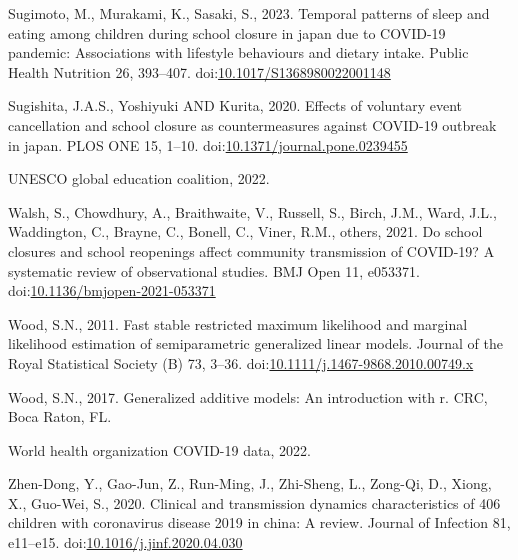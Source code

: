 \documentclass[unnumsec,webpdf,contemporary,large]{oup-authoring-template}%
\theoremstyle{thmstyleone}%
\theoremstyle{thmstyletwo}%
\theoremstyle{thmstylethree}%
\newlength{\cslhangindent}
\newlength{\cslentryspacingunit} %
\newenvironment{CSLReferences}[2] %
 {%
  \setlength{\parindent}{0pt}
  \ifodd #1
  \let\oldpar\par
  \def\par{\hangindent=\cslhangindent\oldpar}
  \fi
  \setlength{\parskip}{#2\cslentryspacingunit}
 }%
 {}
\begin{document}
\begin{CSLReferences}{1}{0}
\leavevmode{}%
Sugimoto, M., Murakami, K., Sasaki, S., 2023. Temporal patterns of sleep and eating among children during school closure in japan due to COVID-19 pandemic: Associations with lifestyle behaviours and dietary intake. Public Health Nutrition 26, 393--407. doi:\href{https://doi.org/10.1017/S1368980022001148}{10.1017/S1368980022001148}

\leavevmode{}%
Sugishita, J.A.S., Yoshiyuki AND Kurita, 2020. Effects of voluntary event cancellation and school closure as countermeasures against COVID-19 outbreak in japan. PLOS ONE 15, 1--10. doi:\href{https://doi.org/10.1371/journal.pone.0239455}{10.1371/journal.pone.0239455}

\leavevmode{}%
{UNESCO} global education coalition, 2022.

\leavevmode{}%
Walsh, S., Chowdhury, A., Braithwaite, V., Russell, S., Birch, J.M., Ward, J.L., Waddington, C., Brayne, C., Bonell, C., Viner, R.M., others, 2021. Do school closures and school reopenings affect community transmission of COVID-19? A systematic review of observational studies. BMJ Open 11, e053371. doi:\href{https://doi.org/10.1136/bmjopen-2021-053371}{10.1136/bmjopen-2021-053371}

\leavevmode{}%
Wood, S.N., 2011. Fast stable restricted maximum likelihood and marginal likelihood estimation of semiparametric generalized linear models. Journal of the Royal Statistical Society (B) 73, 3--36. doi:\href{https://doi.org/10.1111/j.1467-9868.2010.00749.x}{10.1111/j.1467-9868.2010.00749.x}

\leavevmode{}%
Wood, S.N., 2017. Generalized additive models: An introduction with r. CRC, Boca Raton, FL.

\leavevmode{}%
World health organization COVID-19 data, 2022.

\leavevmode{}%
Zhen-Dong, Y., Gao-Jun, Z., Run-Ming, J., Zhi-Sheng, L., Zong-Qi, D., Xiong, X., Guo-Wei, S., 2020. Clinical and transmission dynamics characteristics of 406 children with coronavirus disease 2019 in china: A review. Journal of Infection 81, e11--e15. doi:\href{https://doi.org/10.1016/j.jinf.2020.04.030}{10.1016/j.jinf.2020.04.030}

\end{CSLReferences}
\end{document}
